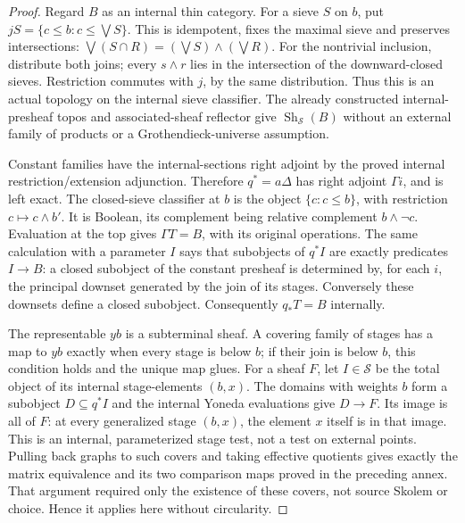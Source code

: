 \begin{proof}
Regard \(B\) as an internal thin category. For a sieve \(S\)
on \(b\), put \(jS=\{c\le b:c\le\bigvee S\}\). This is
idempotent, fixes the maximal sieve and preserves intersections:
\(\bigvee(S\cap R)=(\bigvee S)\wedge(\bigvee R)\).
For the nontrivial inclusion, distribute both joins; every
\(s\wedge r\) lies in the intersection of the downward-closed
sieves. Restriction commutes with \(j\), by the same distribution.
Thus this is an actual topology on the internal sieve classifier.
The already constructed internal-presheaf topos and associated-sheaf
reflector give \(\operatorname{Sh}_{\mathcal S}(B)\) without an
external family of products or a Grothendieck-universe assumption.

Constant families have the internal-sections right adjoint by the
proved internal restriction/extension adjunction. Therefore
\(q^*=a\Delta\) has right adjoint \(\Gamma i\), and is left
exact. The closed-sieve classifier at \(b\) is the object
\(\{c:c\le b\}\), with restriction \(c\mapsto c\wedge b'\).
It is Boolean, its complement being relative complement
\(b\wedge\neg c\). Evaluation at the top gives
\(\Gamma T=B\), with its original operations. The same calculation
with a parameter \(I\) says that subobjects of \(q^*I\) are
exactly predicates \(I\to B\): a closed subobject of the constant
presheaf is determined by, for each \(i\), the principal downset
generated by the join of its stages. Conversely these downsets define
a closed subobject. Consequently \(q_*T=B\) internally.

The representable \(y b\) is a subterminal sheaf. A covering family
of stages has a map to \(y b\) exactly when every stage is below
\(b\); if their join is below \(b\), this condition holds and
the unique map glues. For a sheaf \(F\), let \(I\in\mathcal S\)
be the total object of its internal stage-elements \((b,x)\).
The domains with weights \(b\) form a subobject \(D\subseteq q^*I\)
and the internal Yoneda evaluations give \(D\to F\). Its image is
all of \(F\): at every generalized stage \((b,x)\), the element
\(x\) itself is in that image. This is an internal, parameterized
stage test, not a test on external points. Pulling back graphs to
such covers and taking effective quotients gives exactly the matrix
equivalence and its two comparison maps proved in the preceding annex.
That argument required only the existence of these covers, not source
Skolem or choice. Hence it applies here without circularity.


\end{proof}
